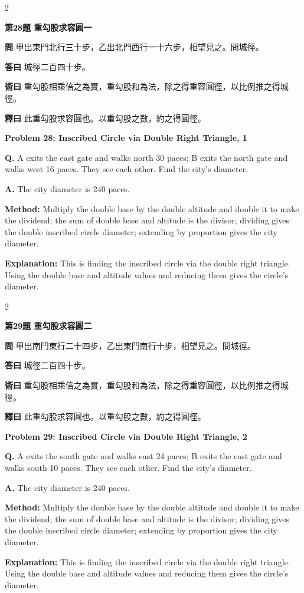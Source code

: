 \documentclass[11pt,a4paper]{article}
\newcommand{\wen}[1]{\noindent\textbf{問} #1\par\smallskip}
\newcommand{\da}[1]{\noindent\textbf{答曰} #1\par\smallskip}
\newcommand{\shu}[1]{\noindent\textbf{術曰} #1\par\smallskip}
\newcommand{\shi}[1]{\noindent\textbf{釋曰} #1\par\smallskip}
\newcommand{\wenE}[1]{\noindent\textbf{Q.} #1\par\smallskip}
\newcommand{\daE}[1]{\noindent\textbf{A.} #1\par\smallskip}
\newcommand{\shuE}[1]{\noindent\textbf{Method:} #1\par\smallskip}
\newcommand{\shiE}[1]{\noindent\textbf{Explanation:} #1\par\smallskip}
\begin{document}
\bigskip

\begin{paracol}{2}

\noindent\textbf{第28題 重勾股求容圓一}

\wen{甲出東門北行三十步，乙出北門西行一十六步，相望見之。問城徑。}
\da{城徑二百四十步。}
\shu{重勾股相乘倍之為實，重勾股和為法，除之得重容圓徑，以比例推之得城徑。}
\shi{此重勾股求容圓也。以重勾股之數，約之得圓徑。}

\switchcolumn

\noindent\textbf{Problem 28: Inscribed Circle via Double Right Triangle, 1}

\wenE{A exits the east gate and walks north 30 paces; B exits the north gate and walks west 16 paces. They see each other. Find the city's diameter.}
\daE{The city diameter is 240 paces.}
\shuE{Multiply the double base by the double altitude and double it to make the dividend; the sum of double base and altitude is the divisor; dividing gives the double inscribed circle diameter; extending by proportion gives the city diameter.}
\shiE{This is finding the inscribed circle via the double right triangle. Using the double base and altitude values and reducing them gives the circle's diameter.}

\end{paracol}

\bigskip

\begin{paracol}{2}

\noindent\textbf{第29題 重勾股求容圓二}

\wen{甲出南門東行二十四步，乙出東門南行十步，相望見之。問城徑。}
\da{城徑二百四十步。}
\shu{重勾股相乘倍之為實，重勾股和為法，除之得重容圓徑，以比例推之得城徑。}
\shi{此重勾股求容圓也。以重勾股之數，約之得圓徑。}

\switchcolumn

\noindent\textbf{Problem 29: Inscribed Circle via Double Right Triangle, 2}

\wenE{A exits the south gate and walks east 24 paces; B exits the east gate and walks south 10 paces. They see each other. Find the city's diameter.}
\daE{The city diameter is 240 paces.}
\shuE{Multiply the double base by the double altitude and double it to make the dividend; the sum of double base and altitude is the divisor; dividing gives the double inscribed circle diameter; extending by proportion gives the city diameter.}
\shiE{This is finding the inscribed circle via the double right triangle. Using the double base and altitude values and reducing them gives the circle's diameter.}

\end{paracol}
\end{document}
